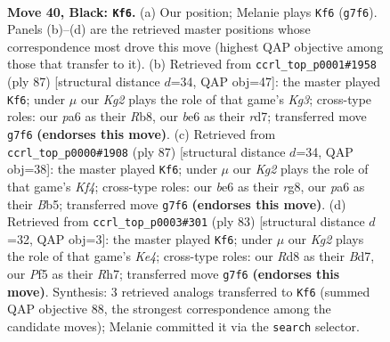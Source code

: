 \documentclass[11pt]{article}
\begin{document}
\clearpage

\begin{figure}[p]\centering
\begin{subfigure}{0.46\textwidth}\centering
\resizebox{\linewidth}{!}{%
\newchessgame
\chessboard[
  setfen={3r4/p5k1/Pp2B2b/5p2/4pP1n/8/5K2/1RB5 b - - 13 40},
  showmover=false,
  pgfstyle=straightmove, color=movearrow, markmove={g7-f6}
]}
\caption{}
\end{subfigure}\hfill
\begin{subfigure}{0.46\textwidth}\centering
\resizebox{\linewidth}{!}{%
\newchessgame
\chessboard[
  setfen={1r6/3Rp3/4P1k1/Pp1B1b1p/7p/8/7K/8 b - - 1 44},
  showmover=false,
  pgfstyle=straightmove, color=movearrow, markmove={g6-f6}
]}
\caption{}
\end{subfigure}
\\[4pt]
\begin{subfigure}{0.46\textwidth}\centering
\resizebox{\linewidth}{!}{%
\newchessgame
\chessboard[
  setfen={6R1/p7/1b1Bp3/1b1p1kpp/3P4/1P2K3/8/8 b - - 5 44},
  showmover=false,
  pgfstyle=straightmove, color=movearrow, markmove={f5-f6}
]}
\caption{}
\end{subfigure}\hfill
\begin{subfigure}{0.46\textwidth}\centering
\resizebox{\linewidth}{!}{%
\newchessgame
\chessboard[
  setfen={8/3b3r/1pp4P/p3k3/P7/2Pn4/4R1B1/2B3K1 b - - 20 42},
  showmover=false,
  pgfstyle=straightmove, color=movearrow, markmove={e5-f6}
]}
\caption{}
\end{subfigure}
\caption{\textbf{Move 40, Black: \texttt{Kf6}.} (a) Our position; Melanie plays \texttt{Kf6} (\texttt{g7f6}). Panels (b)--(d) are the retrieved master positions whose correspondence most drove this move (highest QAP objective among those that transfer to it). (b) Retrieved from \texttt{ccrl\_top\_p0001\#1958} (ply 87) [structural distance $d$=34, QAP obj=47]: the master played \texttt{Kf6}; under $\mu$ our \emph{Kg2} plays the role of that game's \emph{Kg3}; cross-type roles: our \emph{p}a6 as their \emph{R}b8, our \emph{b}e6 as their \emph{r}d7; transferred move \texttt{g7f6} \textbf{(endorses this move)}. (c) Retrieved from \texttt{ccrl\_top\_p0000\#1908} (ply 87) [structural distance $d$=34, QAP obj=38]: the master played \texttt{Kf6}; under $\mu$ our \emph{Kg2} plays the role of that game's \emph{Kf4}; cross-type roles: our \emph{b}e6 as their \emph{r}g8, our \emph{p}a6 as their \emph{B}b5; transferred move \texttt{g7f6} \textbf{(endorses this move)}. (d) Retrieved from \texttt{ccrl\_top\_p0003\#301} (ply 83) [structural distance $d$=32, QAP obj=3]: the master played \texttt{Kf6}; under $\mu$ our \emph{Kg2} plays the role of that game's \emph{Ke4}; cross-type roles: our \emph{R}d8 as their \emph{B}d7, our \emph{P}f5 as their \emph{R}h7; transferred move \texttt{g7f6} \textbf{(endorses this move)}. Synthesis: 3 retrieved analogs transferred to \texttt{Kf6} (summed QAP objective 88, the strongest correspondence among the candidate moves); Melanie committed it via the \texttt{search} selector.}
\label{fig:thought-m79}
\end{figure}
\end{document}
